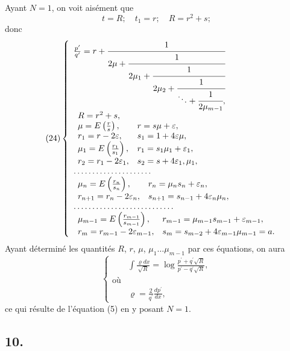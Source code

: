 \documentclass[oneside, 12 pt, leqno]{memoir}
\begin{document}
Ayant \(N=1\), on voit aisément que
\[t=R ; \quad t_1=r ; \quad R=r^2+s;\]
donc
\[\tag{24}
\left\{ \begin{array}{l}
 \frac{p^{\prime}}{q^{\prime}}=r+\cfrac{1}{2 \mu+\cfrac{1}{2 \mu_1+\cfrac{1}{2 \mu_2+\cfrac{1}{\ddots+\cfrac{1}{2 \mu_{m-1}},}}}} \\
\begin{array}{ll} R=r^2+s,& \\
 \mu=E\left(\frac{r}{s}\right), & r=s \mu+\varepsilon, \\
 r_1=r-2 \varepsilon,& s_1=1+4 \varepsilon \mu, \\
 \mu_1=E\left(\frac{r_1}{s_1}\right), & r_1=s_1 \mu_1+\varepsilon_1, \\
 r_2=r_1-2 \varepsilon_1, & s_2=s+4 \varepsilon_1, \mu_1 , \end{array}\\
 \dots \dots \dots \dots \dots \dots \dots\\
\begin{array}{ll} \mu_n=E\left(\frac{r_n}{s_n}\right), & r_n=\mu_n s_n+\varepsilon_n, \\
 r_{n+1}=r_n-2 \varepsilon_n, &s_{n+1}=s_{n-1}+4 \varepsilon_n \mu_n , \end{array} \\
 \dots \dots \dots \dots \dots \dots \dots \dots \dots \\
 \begin{array}{ll} \mu_{m-1}=E\left(\frac{r_{m-1}}{s_{m-1}}\right), & r_{m-1}=\mu_{m-1} s_{m-1}+\varepsilon_{m-1}, \\
 r_m=r_{m-1}-2 \varepsilon_{m-1}, & s_m=s_{m-2}+4 \varepsilon_{m-1} \mu_{m-1}=a. \end{array}
\end{array}\right.\]
Ayant déterminé les quantités \(R\), \(r\), \(\mu\), \(\mu_1 \dots \mu_{m-1}\) par ces équations, on aura
\[\tag{25}\left\{\begin{array}{lc}
&\int \frac{\varrho d x}{\sqrt{R}}=\log \frac{p^{\prime}+q^{\prime} \sqrt{R}}{p^{\prime}-q^{\prime} \sqrt{R}}, \\
\text{où} &\\
&\varrho=\frac{2}{q^{\prime}} \frac{d p^{\prime}}{d x},
\end{array}\right.\]
ce qui résulte de l'équation (5) en y posant \(N=1\).

\subsection*{10.}
\end{document}
